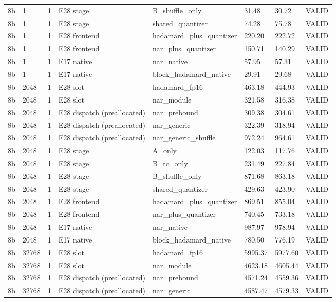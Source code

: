{\begin{longtable}{llllllll}
8b & 1 & 1 & E28 stage & B\_shuffle\_only & 31.48 & 30.72 & VALID \\
8b & 1 & 1 & E28 stage & shared\_quantizer & 74.28 & 75.78 & VALID \\
8b & 1 & 1 & E28 frontend & hadamard\_plus\_quantizer & 220.20 & 222.72 & VALID \\
8b & 1 & 1 & E28 frontend & nar\_plus\_quantizer & 150.71 & 140.29 & VALID \\
8b & 1 & 1 & E17 native & nar\_native & 57.95 & 57.31 & VALID \\
8b & 1 & 1 & E17 native & block\_hadamard\_native & 29.91 & 29.68 & VALID \\
8b & 2048 & 1 & E28 slot & hadamard\_fp16 & 463.18 & 444.93 & VALID \\
8b & 2048 & 1 & E28 slot & nar\_module & 321.58 & 316.38 & VALID \\
8b & 2048 & 1 & E28 dispatch (preallocated) & nar\_prebound & 309.38 & 304.61 & VALID \\
8b & 2048 & 1 & E28 dispatch (preallocated) & nar\_generic & 322.39 & 318.94 & VALID \\
8b & 2048 & 1 & E28 dispatch (preallocated) & nar\_generic\_shuffle & 972.24 & 964.61 & VALID \\
8b & 2048 & 1 & E28 stage & A\_only & 122.03 & 117.76 & VALID \\
8b & 2048 & 1 & E28 stage & B\_tc\_only & 231.49 & 227.84 & VALID \\
8b & 2048 & 1 & E28 stage & B\_shuffle\_only & 871.68 & 863.18 & VALID \\
8b & 2048 & 1 & E28 stage & shared\_quantizer & 429.63 & 423.90 & VALID \\
8b & 2048 & 1 & E28 frontend & hadamard\_plus\_quantizer & 869.51 & 855.04 & VALID \\
8b & 2048 & 1 & E28 frontend & nar\_plus\_quantizer & 740.45 & 733.18 & VALID \\
8b & 2048 & 1 & E17 native & nar\_native & 987.97 & 978.94 & VALID \\
8b & 2048 & 1 & E17 native & block\_hadamard\_native & 780.50 & 776.19 & VALID \\
8b & 32768 & 1 & E28 slot & hadamard\_fp16 & 5995.37 & 5977.60 & VALID \\
8b & 32768 & 1 & E28 slot & nar\_module & 4623.18 & 4605.44 & VALID \\
8b & 32768 & 1 & E28 dispatch (preallocated) & nar\_prebound & 4571.24 & 4559.36 & VALID \\
8b & 32768 & 1 & E28 dispatch (preallocated) & nar\_generic & 4587.47 & 4579.33 & VALID \\

\end{longtable}}
